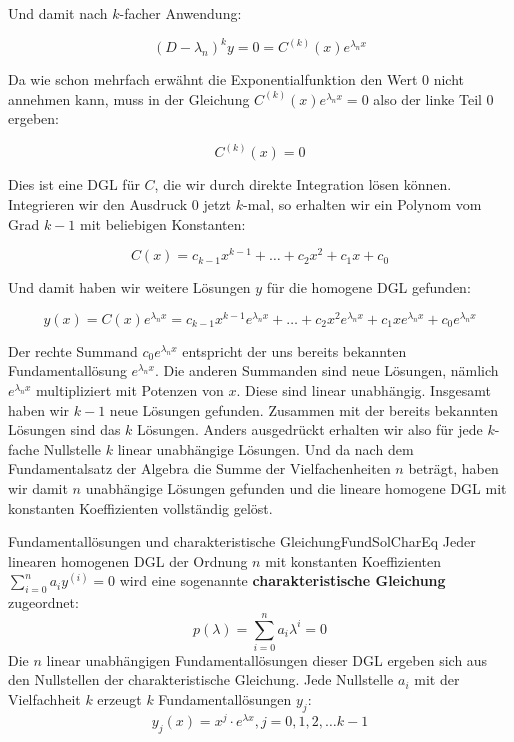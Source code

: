 Und damit nach $k$-facher Anwendung:

$$
    (D-\lambda_n)^k y = 0 = C^{(k)}(x) e^{\lambda_n x}
$$

Da wie schon mehrfach erwähnt die Exponentialfunktion den Wert $0$ nicht annehmen kann, muss in der Gleichung $C^{(k)}(x) e^{\lambda_n x} = 0$ also der linke Teil $0$ ergeben:

$$
    C^{(k)}(x) = 0
$$

Dies ist eine DGL für $C$, die wir durch direkte Integration lösen können. Integrieren wir den Ausdruck $0$ jetzt $k$-mal, so erhalten wir ein Polynom vom Grad $k-1$ mit beliebigen Konstanten:

$$
    C(x) = c_{k-1} x^{k-1} + \dots + c_2 x^2 + c_1 x + c_0
$$

Und damit haben wir weitere Lösungen $y$ für die homogene DGL gefunden:

$$
    y(x) = C(x) e^{\lambda_n x} = c_{k-1} x^{k-1} e^{\lambda_n x} + \dots + c_2 x^2 e^{\lambda_n x} + c_1 x e^{\lambda_n x} + c_0 e^{\lambda_n x}
$$

Der rechte Summand $c_0 e^{\lambda_n x}$ entspricht der uns bereits bekannten Fundamentallösung $e^{\lambda_n x}$. Die anderen Summanden sind neue Lösungen, nämlich $e^{\lambda_n x}$ multipliziert mit Potenzen von $x$. Diese sind linear unabhängig. Insgesamt haben wir $k-1$ neue Lösungen gefunden. Zusammen mit der bereits bekannten Lösungen sind das $k$ Lösungen. Anders ausgedrückt erhalten wir also für jede $k$-fache Nullstelle $k$ linear unabhängige Lösungen. Und da nach dem Fundamentalsatz der Algebra die Summe der Vielfachenheiten $n$ beträgt, haben wir damit $n$ unabhängige Lösungen gefunden und die lineare homogene DGL mit konstanten Koeffizienten vollständig gelöst.

\begin{statement}{Fundamentallösungen und charakteristische Gleichung}{FundSolCharEq}
    Jeder linearen homogenen DGL der Ordnung $n$ mit konstanten Koeffizienten $\sum\limits_{i=0}^n a_i y^{(i)} = 0$ wird eine sogenannte \textbf{charakteristische Gleichung} zugeordnet:
    $$
        p(\lambda) = \sum\limits_{i=0}^n a_i \lambda^i = 0
    $$
    Die $n$ linear unabhängigen Fundamentallösungen dieser DGL ergeben sich aus den Nullstellen der charakteristische Gleichung. Jede Nullstelle $a_i$ mit der Vielfachheit $k$ erzeugt $k$ Fundamentallösungen $y_j$:
    $$
        y_j(x) = x^j \cdot e^{\lambda x}, j = 0, 1, 2, \dots {k-1}
    $$
\end{statement}

